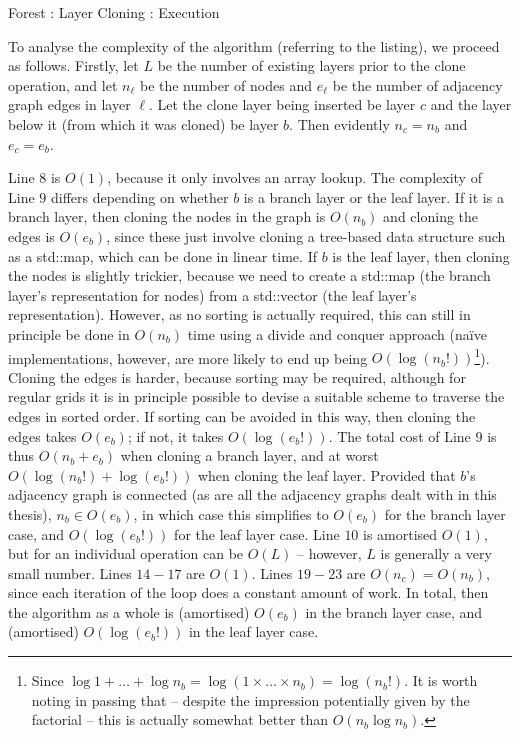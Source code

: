 \begin{stulisting}[!t]
\caption{Forest : Layer Cloning : Execution}
\label{code:ipfs-forest-clonelayerimpl}

\end{stulisting}

To analyse the complexity of the algorithm (referring to the listing), we proceed as follows. Firstly, let $L$ be the number of existing layers prior to the clone operation, and let $n_\ell$ be the number of nodes and $e_\ell$ be the number of adjacency graph edges in layer $\ell$. Let the clone layer being inserted be layer $c$ and the layer below it (from which it was cloned) be layer $b$. Then evidently $n_c = n_b$ and $e_c = e_b$.

Line $8$ is $O(1)$, because it only involves an array lookup. The complexity of Line $9$ differs depending on whether $b$ is a branch layer or the leaf layer. If it is a branch layer, then cloning the nodes in the graph is $O(n_b)$ and cloning the edges is $O(e_b)$, since these just involve cloning a tree-based data structure such as a std::map, which can be done in linear time. If $b$ is the leaf layer, then cloning the nodes is slightly trickier, because we need to create a std::map (the branch layer's representation for nodes) from a std::vector (the leaf layer's representation). However, as no sorting is actually required, this can still in principle be done in $O(n_b)$ time using a divide and conquer approach (na\"ive implementations, however, are more likely to end up being $O(\log (n_b!))$\footnote{Since $\log 1 + \ldots + \log n_b = \log (1 \times \ldots \times n_b) = \log (n_b!)$. It is worth noting in passing that -- despite the impression potentially given by the factorial -- this is actually somewhat better than $O(n_b \log n_b)$.}). Cloning the edges is harder, because sorting may be required, although for regular grids it is in principle possible to devise a suitable scheme to traverse the edges in sorted order. If sorting can be avoided in this way, then cloning the edges takes $O(e_b)$; if not, it takes $O(\log (e_b!))$. The total cost of Line $9$ is thus $O(n_b + e_b)$ when cloning a branch layer, and at worst $O(\log (n_b!) + \log (e_b!))$ when cloning the leaf layer. Provided that $b$'s adjacency graph is connected (as are all the adjacency graphs dealt with in this thesis), $n_b \in O(e_b)$, in which case this simplifies to $O(e_b)$ for the branch layer case, and $O(\log (e_b!))$ for the leaf layer case. Line $10$ is amortised $O(1)$, but for an individual operation can be $O(L)$ -- however, $L$ is generally a very small number. Lines $14-17$ are $O(1)$. Lines $19-23$ are $O(n_c) = O(n_b)$, since each iteration of the loop does a constant amount of work. In total, then the algorithm as a whole is (amortised) $O(e_b)$ in the branch layer case, and (amortised) $O(\log (e_b!))$ in the leaf layer case.

